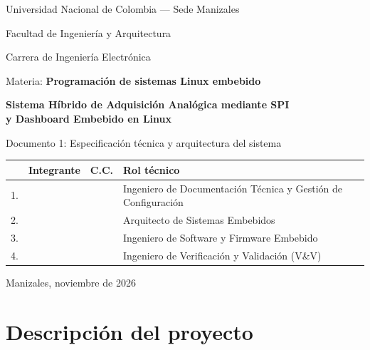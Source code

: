 \documentclass[12pt,a4paper]{article}
\begin{document}
\begin{titlepage}
\centering
{\large Universidad Nacional de Colombia --- Sede Manizales\par}
{\large Facultad de Ingeniería y Arquitectura\par}
{\large Carrera de Ingeniería Electrónica\par}
\vspace{1.2cm}
{\large Materia: \textbf{Programación de sistemas Linux embebido}\par}
\vspace{1.8cm}
{\LARGE\bfseries Sistema Híbrido de Adquisición Analógica mediante SPI\\[0.3cm]
y Dashboard Embebido en Linux\par}
\vspace{0.5cm}
{\Large Documento 1: Especificación técnica y arquitectura del sistema\par}
\vspace{1.5cm}

\small
\begin{tabular}{@{}p{0.5cm} p{4.2cm} p{2.8cm} p{6.0cm}@{}}
\toprule
& \textbf{Integrante} & \textbf{C.C.} & \textbf{Rol técnico} \\
\midrule
1. & \hrulefill & \hrulefill & Ingeniero de Documentación Técnica y Gestión de Configuración \\[0.7cm]
2. & \hrulefill & \hrulefill & Arquitecto de Sistemas Embebidos \\[0.7cm]
3. & \hrulefill & \hrulefill & Ingeniero de Software y Firmware Embebido \\[0.7cm]
4. & \hrulefill & \hrulefill & Ingeniero de Verificación y Validación (V\&V) \\[0.7cm]
\bottomrule
\end{tabular}

\vfill
Manizales, noviembre de 2026
\end{titlepage}

\tableofcontents
\newpage

\section{Descripción del proyecto}
\end{document}
